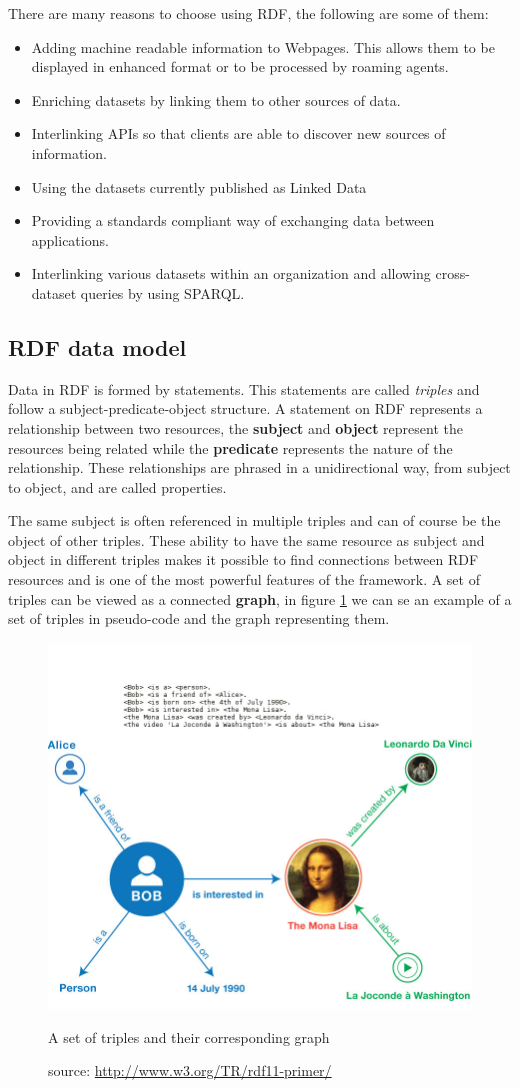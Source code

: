 There are many reasons to choose using RDF, the following are some of them:

\begin{itemize}
	\item Adding machine readable information to Webpages. This allows them to be displayed in enhanced format or to be processed by roaming agents.
	\item Enriching datasets by linking them to other sources of data.
	\item Interlinking APIs so that clients are able to discover new sources of information.
	\item Using the datasets currently published as Linked Data 
	\item Providing a standards compliant way of exchanging data between applications.
	\item Interlinking various datasets within an organization and allowing cross-dataset queries by using SPARQL.
\end{itemize}

\subsection*{RDF data model}

Data in RDF is formed by statements. This statements are called \textit{triples} and follow a subject-predicate-object structure. A statement on RDF represents a relationship between two resources, the \textbf{subject} and \textbf{object} represent the resources being related while the \textbf{predicate} represents the nature of the relationship. These relationships are phrased in a unidirectional way, from subject to object, and are called properties.

The same subject is often referenced in multiple triples and can of course be the object of other triples. These ability to have the same resource as subject and object in different triples makes it possible to find connections between RDF resources and is one of the most powerful features of the framework. A set of triples can be viewed as a connected \textbf{graph}, in figure \ref{fig:rdfgraph} we can se an example of a set of triples in pseudo-code and the graph representing them.

\begin{figure}
  \centering
  \includegraphics[width=.6\textwidth]{fig/rdfgraph}
  \caption{A set of triples and their corresponding graph}
  \caption*{source: \url{http://www.w3.org/TR/rdf11-primer/}}
  \label{fig:rdfgraph}
\end{figure} 

